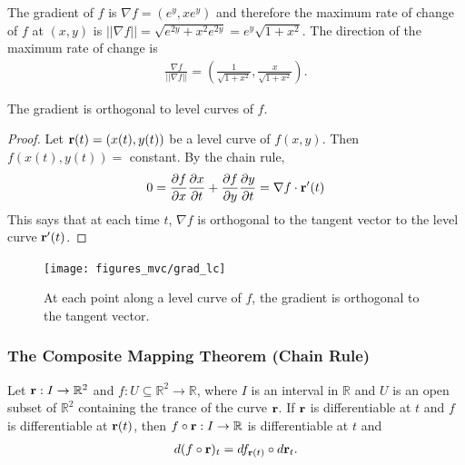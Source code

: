 \documentclass[12pt,letterpaper,reqno]{article}
\numberwithin{equation}{section}
\newcommand{\R}{\ensuremath{\mathbb R}}
\newcommand{\bbr}{{\bf r}}
\begin{document}
{{\color{red}
\begin{solution}
	The gradient of $f$ is $\nabla f=(e^y,xe^y)$ and therefore the maximum rate of change of $f$ at $(x,y)$ is $||\nabla f||=\sqrt{e^{2y}+x^2e^{2y}}=e^y\sqrt{1+x^2}$. The direction of the maximum rate of change is 
	\begin{align*}
		\frac{\nabla f}{||\nabla f||}=\left(\frac{1}{\sqrt{1+x^2}},\frac{x}{\sqrt{1+x^2}}\right).
	\end{align*}
\end{solution}}

 
 

\begin{thm}
The gradient is orthogonal to level curves of $f$.	
\end{thm}

\begin{proof}
	Let $\bbr(t)=(x(t),y(t))$ be a level curve of $f(x,y)$. Then $f(x(t),y(t))=$ constant. By the chain rule,
	\begin{align*}
		0=\frac{\partial f}{\partial x}\frac{\partial x}{\partial t}+\frac{\partial f}{\partial y}\frac{\partial y}{\partial t}=\nabla f \cdot \bbr'(t)
	\end{align*}
	This says that at each time $t$, $\nabla f$ is orthogonal to the tangent vector to the level curve $\bbr'(t)$.
\end{proof}

\begin{figure}[h]
	\centering
	\texttt{[image: figures\_mvc/grad\_lc]}
	\caption{At each point along a level curve of $f$, the gradient is orthogonal to the tangent vector.}
\end{figure}


\subsubsection{The Composite Mapping Theorem (Chain Rule)}
\begin{thm}
	Let $\bbr:I \to \R^2$ and $f:U \subseteq \R^2 \to \R$, where $I$ is an interval in $\R$ and $U$ is an open subset of $\R^2$ containing the trance of the curve $\bbr$. If $\bbr$ is differentiable at $t$ and $f$ is differentiable at $\bbr(t)$, then $f \circ \bbr:I \to \R$ is differentiable at $t$ and
	\begin{align*}
		d(f \circ \bbr)_{t}=df_{\bbr(t)} \circ d\bbr_t.
	\end{align*}
\end{thm}

}
\end{document}
